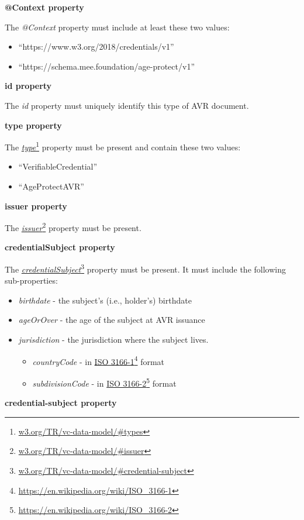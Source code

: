 \documentclass[11pt, oneside]{article}   	%
\newcommand{\hyperfootnote}[1][]{\def\ArgI{{#1}}\hyperfootnoteRelay}
\newcommand\hyperfootnoteRelay[2][]{\href{#1#2}{\ArgI}\footnote{\href{#1#2}{#2}}}
\begin{document}
\textbf{@Context property}

The \emph{@Context} property must include at least these two values:
\begin{itemize}
	\item ``https://www.w3.org/2018/credentials/v1''
	\item ``https://schema.mee.foundation/age-protect/v1''
\end{itemize}

\textbf{id property}

The \emph{id} property must uniquely identify this type of AVR document. 
	
\textbf{type property}

The \hyperfootnote[\emph{type}][https://]{w3.org/TR/vc-data-model/\#types} property must be present and contain these two values:
\begin{itemize}
	\item ``VerifiableCredential''
	\item ``AgeProtectAVR''
\end{itemize}

\textbf{issuer property}

The \hyperfootnote[\emph{issuer}][https://]{w3.org/TR/vc-data-model/\#issuer} property must be present.

\textbf{credentialSubject property}

The \hyperfootnote[\emph{credentialSubject}][https://]{w3.org/TR/vc-data-model/\#credential-subject} property must be present. It must include the following sub-properties:
\begin{itemize}
	\item \emph{birthdate} - the subject's (i.e., holder's) birthdate
	\item \emph{ageOrOver} - the age of the subject at AVR issuance
	\item \emph{jurisdiction} - the jurisdiction where the subject lives. 
	\begin{itemize}
		\item \emph{countryCode} - in \hyperfootnote[ISO 3166-1]["https://"]{https://en.wikipedia.org/wiki/ISO\_3166-1} format
		\item \emph{subdivisionCode} - in \hyperfootnote[ISO 3166-2][https://]{https://en.wikipedia.org/wiki/ISO\_3166-2} format
	\end{itemize}
\end{itemize}

\textbf{credential-subject property}
\end{document}
